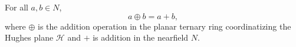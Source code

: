For all $a, b \in N$,
$$a \oplus b = a + b,$$
where $\oplus$ is the addition operation in the planar ternary ring coordinatizing the Hughes plane $\mathcal{H}$ and $+$ is addition in the nearfield $N$.
